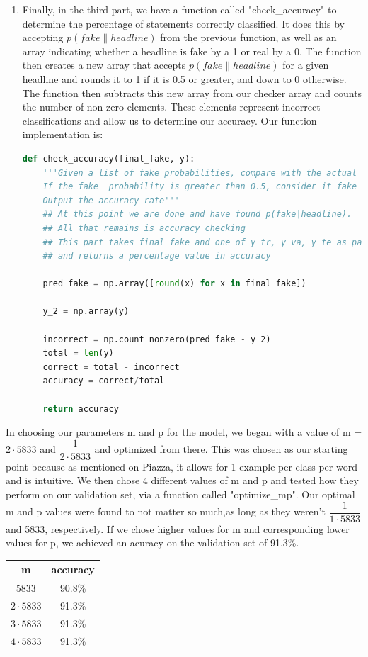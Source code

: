 \documentclass{article}
\begin{document}
\begin{enumerate}
\item 
Finally, in the third part, we have a function called "check\_accuracy" to determine the percentage of statements correctly classified. It does this by accepting $p(fake\|headline)$ from the previous function,
as well as an array indicating whether a headline is fake by a 1 or real by a 0. The function then creates a new array that accepts  $p(fake\|headline)$ for a given headline and rounds it to 1 if it is 0.5 or greater, and down to 0 otherwise.
The function then subtracts this new array from our checker array and counts the number of non-zero elements. These elements represent incorrect classifications and allow us to determine our accuracy.
Our function  implementation is:
\begin{lstlisting}[language=Python]
def check_accuracy(final_fake, y):
    '''Given a list of fake probabilities, compare with the actual results by rounding.
    If the fake  probability is greater than 0.5, consider it fake and if less, consider it real.
    Output the accuracy rate'''
    ## At this point we are done and have found p(fake|headline).
    ## All that remains is accuracy checking
    ## This part takes final_fake and one of y_tr, y_va, y_te as parameters
    ## and returns a percentage value in accuracy

    pred_fake = np.array([round(x) for x in final_fake])
    
    y_2 = np.array(y)
    
    incorrect = np.count_nonzero(pred_fake - y_2)
    total = len(y)
    correct = total - incorrect
    accuracy = correct/total    
    
    return accuracy

  \end{lstlisting}





\end{enumerate}

In choosing our parameters m and p for the model, we began with a value of m = $2 \cdot 5833 $ and $ \dfrac {1}{2 \cdot 5833}$ and optimized from there. This was chosen as our starting point because as mentioned on Piazza, it allows for
1 example per class per word and is intuitive. We then chose 4 different values of m and p and tested how they perform on our validation set, via a function called "optimize\_mp". Our optimal m and p values were found to not matter so much,as long as they weren't 
$ \dfrac {1}{1 \cdot 5833}$ and 5833, respectively. If we chose higher values for m and corresponding lower values for p, we achieved an acuracy on the validation set of 91.3\%. 
\begin{center}
\begin{tabular}{ |c|c| } 
 \hline
 m & accuracy \\ [0.5ex] 
\hline \hline
 5833 & 90.8\% \\ 
 $2 \cdot 5833$ & 91.3\% \\ 
 $3 \cdot 5833$ & 91.3\%  \\
 $4 \cdot 5833$ & 91.3\%  \\ 
 \hline
\end{tabular}
\end{center}
\end{document}
